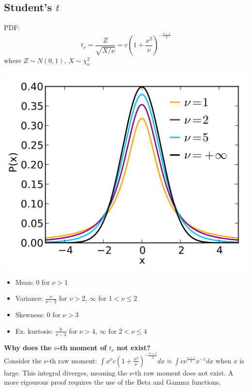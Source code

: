 \documentclass[DIV=14,titlepage=false]{scrreprt}
\begin{document}
\subsection*{Student's \( t \)}
PDF: \[ \displaystyle t_\nu = \frac{Z}{\sqrt{X/\nu}} = c\left(1+\frac{x^2}{\nu}\right)^{-\frac{\nu+1}{2}}\] where $Z\sim N(0,1)$, $X\sim \chi^2_\nu$

\begin{minipage}[c]{0.5\textwidth}
  \includegraphics[width=\textwidth]{./Images/tdistribuion.png}
  \end{minipage}
  \hfill
\begin{minipage}[c]{0.45\textwidth}
  \begin{itemize}
    \item Mean: $0$ for $\nu > 1$
    \item Variance: $\frac{\nu}{\nu - 2}$ for $\nu > 2$, $\infty$ for $1 < \nu \leq 2$
    \item Skewness: $0$ for $\nu > 3$
    \item Ex. kurtosis: $\frac{6}{\nu - 4}$ for $\nu > 4$, $\infty$ for $2 < \nu \leq 4$
  \end{itemize}
  
\end{minipage}

\textbf{Why does the $\nu$-th moment of $t_{\nu}$ not exist?}\\
Consider the $\nu$-th raw moment: $\int x^{\nu}c\left(1+\frac{x^2}{\nu}\right)^{-\frac{\nu+1}{2}}dx \approx \int c \nu^{\frac{\nu+1}{2}}x^{-1}dx$ when $x$ is large. This integral diverges, meaning the $\nu$-th raw moment does not exist. A more rigourous proof requires the use of the Beta and Gamma functions.
\end{document}
